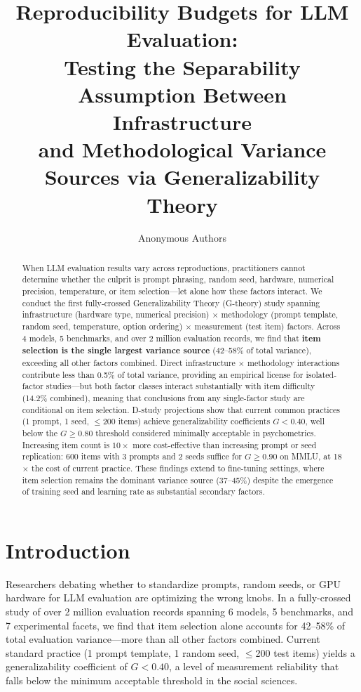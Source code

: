 \documentclass[letterpaper,11pt]{article}
\title{Reproducibility Budgets for LLM Evaluation:\\Testing the Separability Assumption Between Infrastructure\\and Methodological Variance Sources via Generalizability Theory}
\author{
Anonymous Authors
}
\begin{document}
\maketitle

\begin{abstract}
When LLM evaluation results vary across reproductions, practitioners cannot determine whether the culprit is prompt phrasing, random seed, hardware, numerical precision, temperature, or item selection---let alone how these factors interact.
We conduct the first fully-crossed Generalizability Theory (G-theory) study spanning infrastructure (hardware type, numerical precision) $\times$ methodology (prompt template, random seed, temperature, option ordering) $\times$ measurement (test item) factors.
Across 4 models, 5 benchmarks, and over 2 million evaluation records, we find that \textbf{item selection is the single largest variance source} (42--58\% of total variance), exceeding all other factors combined.
Direct infrastructure $\times$ methodology interactions contribute less than 0.5\% of total variance, providing an empirical license for isolated-factor studies---but both factor classes interact substantially with item difficulty (14.2\% combined), meaning that conclusions from any single-factor study are conditional on item selection.
D-study projections show that current common practices (1 prompt, 1 seed, $\leq$200 items) achieve generalizability coefficients $G < 0.40$, well below the $G \geq 0.80$ threshold considered minimally acceptable in psychometrics.
Increasing item count is $10\times$ more cost-effective than increasing prompt or seed replication: 600 items with 3 prompts and 2 seeds suffice for $G \geq 0.90$ on MMLU, at 18$\times$ the cost of current practice.
These findings extend to fine-tuning settings, where item selection remains the dominant variance source (37--45\%) despite the emergence of training seed and learning rate as substantial secondary factors.
\end{abstract}

\section{Introduction}

Researchers debating whether to standardize prompts, random seeds, or GPU hardware for LLM evaluation are optimizing the wrong knobs.
In a fully-crossed study of over 2 million evaluation records spanning 6 models, 5 benchmarks, and 7 experimental facets, we find that item selection alone accounts for 42--58\% of total evaluation variance---more than all other factors combined.
Current standard practice (1 prompt template, 1 random seed, $\leq$200 test items) yields a generalizability coefficient of $G < 0.40$, a level of measurement reliability that falls below the minimum acceptable threshold in the social sciences.
\end{document}
